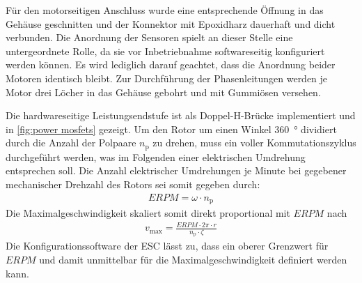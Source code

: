 	Für den motorseitigen Anschluss wurde eine entsprechende Öffnung in das Gehäuse geschnitten und der Konnektor mit Epoxidharz dauerhaft und dicht verbunden.
	Die Anordnung der Sensoren spielt an dieser Stelle eine untergeordnete Rolle, da sie vor Inbetriebnahme softwareseitig konfiguriert werden können.
	Es wird lediglich darauf geachtet, dass die Anordnung beider Motoren identisch bleibt.
	Zur Durchführung der Phasenleitungen werden je Motor drei Löcher in das Gehäuse gebohrt und mit Gummiösen versehen.\par\medskip
	Die hardwareseitige Leistungsendstufe ist als Doppel-H-Brücke implementiert und in \cref{fig:power mosfets} gezeigt.
	Um den Rotor um einen Winkel \qty{360}{\degree} dividiert durch die Anzahl der Polpaare \(n_\text{p}\) zu drehen, muss ein voller Kommutationszyklus durchgeführt werden, was im Folgenden einer elektrischen Umdrehung entsprechen soll.
	Die Anzahl elektrischer Umdrehungen je Minute bei gegebener mechanischer Drehzahl des Rotors sei somit gegeben durch:
	\begin{align}
		ERPM = \omega \cdot n_\text{p}
		\label{eq:ERPM and RPM}
	\end{align}
	Die Maximalgeschwindigkeit skaliert somit direkt proportional mit \(ERPM\) nach
	\begin{align}
		v_\text{max} = \frac{ERPM \cdot 2\pi \cdot r}{n_\text{p} \cdot \zeta}
		\label{eq:max speed by ERPM}
	\end{align}
	Die Konfigurationssoftware der ESC lässt zu, dass ein oberer Grenzwert für \(ERPM\) und damit unmittelbar für die Maximalgeschwindigkeit definiert werden kann.


